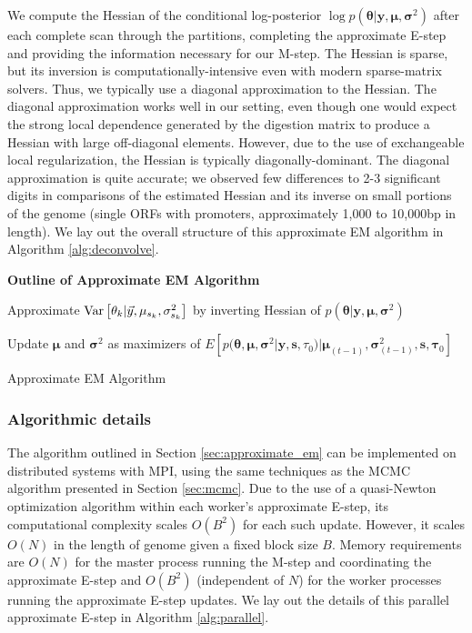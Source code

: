 We compute the Hessian of the conditional log-posterior $\log p(\bm \theta | \bm y, \bm \mu, \bm \sigma^2 )$ after each complete scan through the partitions, completing the approximate E-step and providing the information necessary for our M-step.
The Hessian is sparse, but its inversion is computationally-intensive even with modern sparse-matrix solvers.
Thus, we typically use a diagonal approximation to the Hessian.
The diagonal approximation works well in our setting, even though one would expect the strong local dependence generated by the digestion matrix to produce a Hessian with large off-diagonal elements.
However, due to the use of exchangeable local regularization, the Hessian is typically diagonally-dominant.
The diagonal approximation is quite accurate; we observed few differences to 2-3 significant digits in comparisons of the estimated Hessian and its inverse on small portions of the genome (single ORFs with promoters, approximately 1,000 to 10,000bp in length).
%
We lay out the overall structure of this approximate EM algorithm in Algorithm \ref{alg:deconvolve}.

\begin{algorithm}%
\hspace{-8pt} \textbf{Outline of Approximate EM Algorithm} \\
  {
  Approximate $\operatorname{Var} \left[ \theta_k | \vec y, \mu_{s_k}, \sigma^2_{s_k}
    \right]$ by inverting Hessian of $p(\bm \theta | \bm y, \bm \mu, \bm
    \sigma^2 )$
  
  Update $\bm \mu$ and $\bm \sigma^2$ as maximizers of $E \left[ p(\bm \theta,
    \bm \mu, \bm \sigma^2 | \bm y, \bm s, \tau_0) | \bm \mu_{(t-1)}, \bm
    \sigma^2_{(t-1)}, \bm s, \bm \tau_0 \right]$
 }
 \caption{Approximate EM Algorithm \label{alg:deconvolve}}
\end{algorithm}

\subsubsection{Algorithmic details}
\label{sec:mpi}

The algorithm outlined in Section \ref{sec:approximate_em} can be implemented on distributed systems with MPI, using the same techniques as the MCMC algorithm presented in Section \ref{sec:mcmc}.
Due to the use of a quasi-Newton optimization algorithm within each worker's approximate E-step, its computational complexity scales $O(B^2)$ for each such update.
However, it scales $O(N)$ in the length of genome given a fixed block size $B$.
Memory requirements are $O(N)$ for the master process running the M-step and coordinating the approximate E-step and $O(B^2)$ (independent of $N$) for the worker processes running the approximate E-step updates.
We lay out the details of this parallel approximate E-step in Algorithm \ref{alg:parallel}.


